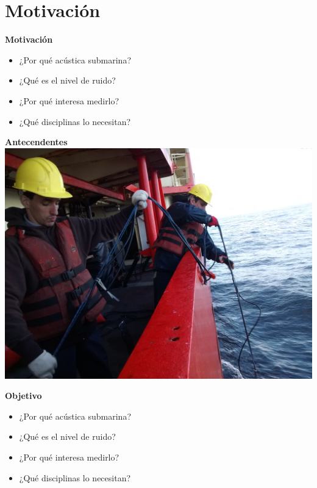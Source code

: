 \documentclass[11pt]{beamer}
\begin{document}
\section{Motivación}

\begin{frame}{\textbf{\LARGE{Motivación}}}
\fontsize{18pt}{18}\selectfont
	\vspace{-.7cm}
	\centering
	\begin{itemize}
	\item ¿Por qué acústica submarina?
	\vspace{15px}
	\item ¿Qué es el nivel de ruido?
	\vspace{15px}
	\item ¿Por qué interesa medirlo?
	\vspace{15px}	
	\item ¿Qué disciplinas lo necesitan?
	\end{itemize}
\end{frame}

\begin{frame}{\textbf{\LARGE{Antecendentes}}}
	\vspace{-.6cm}
		\includegraphics[width=.9\textwidth]{./imagenes/antecedentes.jpg}
\end{frame}

\begin{frame}{\textbf{\LARGE{Objetivo}}}
  \fontsize{18pt}{18}\selectfont
	\vspace{-.7cm}
	\centering
	\begin{itemize}
		\item ¿Por qué acústica submarina?
		\vspace{15px}
		\item ¿Qué es el nivel de ruido?
		\vspace{15px}
		\item ¿Por qué interesa medirlo?
		\vspace{15px}	
		\item ¿Qué disciplinas lo necesitan?
	\end{itemize}
\end{frame}
\end{document}
